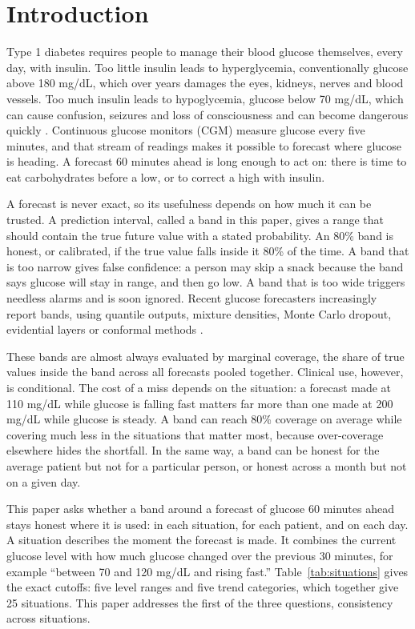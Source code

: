 \section{Introduction}
\label{sec:intro}

Type 1 diabetes requires people to manage their blood glucose themselves, every day, with insulin. Too little insulin leads to hyperglycemia, conventionally glucose above 180 mg/dL, which over years damages the eyes, kidneys, nerves and blood vessels. Too much insulin leads to hypoglycemia, glucose below 70 mg/dL, which can cause confusion, seizures and loss of consciousness and can become dangerous quickly \parencite{battelino2019tir}. Continuous glucose monitors (CGM) measure glucose every five minutes, and that stream of readings makes it possible to forecast where glucose is heading. A forecast 60 minutes ahead is long enough to act on: there is time to eat carbohydrates before a low, or to correct a high with insulin.

A forecast is never exact, so its usefulness depends on how much it can be trusted. A prediction interval, called a band in this paper, gives a range that should contain the true future value with a stated probability. An 80\% band is honest, or calibrated, if the true value falls inside it 80\% of the time. A band that is too narrow gives false confidence: a person may skip a snack because the band says glucose will stay in range, and then go low. A band that is too wide triggers needless alarms and is soon ignored. Recent glucose forecasters increasingly report bands, using quantile outputs, mixture densities, Monte Carlo dropout, evidential layers or conformal methods \parencite[e.g.,][]{sergazinov2023gluformer}.

These bands are almost always evaluated by marginal coverage, the share of true values inside the band across all forecasts pooled together. Clinical use, however, is conditional. The cost of a miss depends on the situation: a forecast made at 110 mg/dL while glucose is falling fast matters far more than one made at 200 mg/dL while glucose is steady. A band can reach 80\% coverage on average while covering much less in the situations that matter most, because over-coverage elsewhere hides the shortfall. In the same way, a band can be honest for the average patient but not for a particular person, or honest across a month but not on a given day.

This paper asks whether a band around a forecast of glucose 60 minutes ahead stays honest where it is used: in each situation, for each patient, and on each day. A situation describes the moment the forecast is made. It combines the current glucose level with how much glucose changed over the previous 30 minutes, for example ``between 70 and 120 mg/dL and rising fast.'' Table~\ref{tab:situations} gives the exact cutoffs: five level ranges and five trend categories, which together give 25 situations. This paper addresses the first of the three questions, consistency across situations.


